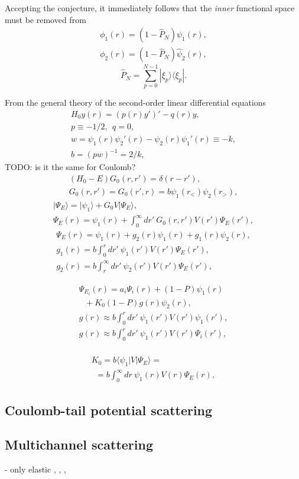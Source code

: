 \documentclass[aip
, pra
, showpacs
, aps
, twocolumn
, groupedaddress
, floatfix
]{revtex4}
\newcommand{\beq}{\begin{equation}}
\newcommand{\eeq}{\end{equation}}
\newcommand{\barr}{\begin{array}}
\newcommand{\earr}{\end{array}}
\begin{document}
Accepting the conjecture, it immediately follows that the {\em inner} functional space must be removed from
\beq \barr{l}
\phi_1(r) = (1-\hat{P}_N) \psi_1(r),\\
\phi_2(r) = (1-\hat{P}_N) \hat{\psi}_2(r),
\earr \eeq
\beq
\hat{P}_N = \sum_{p=0}^{N-1} | \xi_p \rangle \langle \xi_p |.
\eeq



From the general theory of the second-order linear differential equations
\beq \barr{l}
H_0 y(r) = (p(r) y')' - q(r) y,\\
p \equiv -1/2, \ \ q = 0,\\
w = \psi_1(r) \psi_2'(r) - \psi_2(r) \psi_1'(r) \equiv -k,\\
b = (pw)^{-1}= 2/k,
\earr \eeq
TODO: is it the same for Coulomb?
\beq \barr{l}
(H_0 - E) G_0(r,r') = \delta(r-r'),\\
G_0(r,r') = G_0(r',r) = b \psi_1(r_{<}) \psi_2(r_{>}),
\earr \eeq
\beq \barr{l}
| \Psi_E \rangle = | \psi_1 \rangle + G_0 V |\Psi_E \rangle,\\
\Psi_E(r) = \psi_1(r) +  \int_0^\infty dr'\ G_0(r,r') V(r') \Psi_E(r'),
\earr \eeq
\beq \barr{l}
\Psi_E(r) = \psi_1(r) +  g_2(r) \psi_1(r) + g_1(r) \psi_2(r),\\
g_1(r) = b \int_0^r dr'\ \psi_1(r') V(r') \Psi_E(r'), \\
g_2(r) = b \int_r^\infty dr'\ \psi_2(r') V(r') \Psi_E(r'),
\earr \eeq

\beq \barr{l}
\Psi_{E_i}(r) = a_i \Psi_i(r)  + (1-P)\psi_1(r)  \\
\ \ \ + K_0 (1-P)g(r)\psi_2(r),\\
g(r) \approx b \int_0^r dr'\ \psi_1(r') V(r') \psi_1(r'), \\
g(r) \approx b \int_0^r dr'\ \psi_1(r') V(r') \Psi_i(r'), \\
\earr \eeq

\beq \barr{l}
K_0 = b \langle \psi_1 | V | \Psi_E \rangle =\\
\ \ = b \int_0^\infty  dr\ \psi_1(r) V(r) \Psi_E(r),
\earr \eeq




\subsection{Coulomb-tail potential scattering}

\subsection{Multichannel scattering}
\cite{CA73} - only elastic
\cite{NO72},
\cite{TF79},
\cite{Nesbet78}, \cite{Lucchese86}
\end{document}
